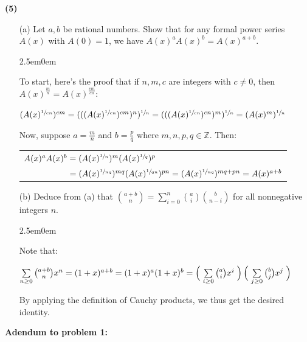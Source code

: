 \documentclass{book}
\newcommand{\exOne}{%
   \color{Purple}%
   \fontsize{13}{15}\selectfont%
}
\newcommand{\exP}{%
   \color{Purple}%
   \fontsize{12}{14}\selectfont%
}
\newenvironment{myIndent}{%
   \begin{adjustwidth}{2.5em}{0em}%
}{%
   \end{adjustwidth}%
}
\newcommand{\blab}[1]{\textbf{#1}}
\newcommand{\retTwo}{\hfill\bigbreak}
\begin{document}
\blab{(5)}
\begin{enumerate}
   \item[(a)] Let $a, b$ be rational numbers. Show that for any formal power series $A(x)$ with $A(0) = 1$, we have $A(x)^aA(x)^b = A(x)^{a + b}$.
   
   \begin{myIndent}\exOne
      To start, here's the proof that if $n,m, c$ are integers with $c \neq 0$, then\\ $A(x)^{\frac{m}{n}} = A(x)^{\frac{cm}{cn}}$:

      {\centering\exP  $(A(x)^{\sfrac{1}{cn}})^{cm} = (((A(x)^{\sfrac{1}{cn}})^{cm})^n)^{\sfrac{1}{n}} = (((A(x)^{\sfrac{1}{cn}})^{cn})^m)^{\sfrac{1}{n}} = (A(x)^m)^{\sfrac{1}{n}}$\retTwo\par}

      Now, suppose $a = \frac{m}{n}$ and $b = \frac{p}{q}$ where $m,n,p,q \in \mathbb{Z}$. Then:

      {\centering\exP 
      \begin{tabular}{l}
         $A(x)^{a}A(x)^b = (A(x)^{\sfrac{1}{n}})^m(A(x)^{\sfrac{1}{q}})^p$\\
         $\phantom{A(x)^{a}A(x)^b} = (A(x)^{\sfrac{1}{nq}})^{mq}(A(x)^{\sfrac{1}{qn}})^{pn} = (A(x)^{\sfrac{1}{nq}})^{mq + pn} = A(x)^{a + b}$
      \end{tabular} \retTwo\par}
   \end{myIndent}

   \item[(b)] Deduce from (a) that $\binom{a+b}{n} = \sum\limits_{i=0}^n \binom{a}{i}\binom{b}{n-i}$ for all nonnegative integers $n$.
   
   \begin{myIndent}\exOne
      Note that:
      
      {\centering $\sum\limits_{n \geq 0}\binom{a + b}{n} x^n = (1 + x)^{a + b} = (1 + x)^a(1 + x)^b = \left(\vphantom{\int_|^|}\right.\sum\limits_{i \geq 0}\binom{a}{i} x^i\left.\vphantom{\int_|^|}\right)\left(\vphantom{\int_|^|}\right.\sum\limits_{j \geq 0}\binom{b}{j} x^j\left.\vphantom{\int_|^|}\right)$\retTwo\par}

      By applying the definition of Cauchy products, we thus get the desired identity.\retTwo
   \end{myIndent}
\end{enumerate}

\blab{Adendum to problem 1:}
\end{document}
